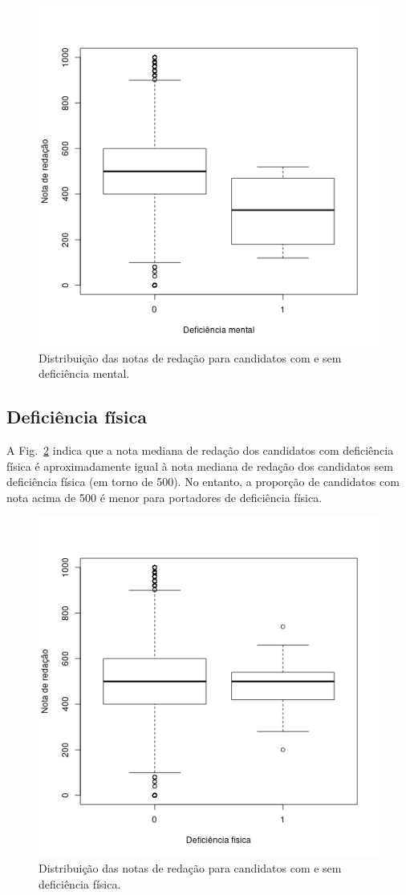 \documentclass[12pt]{article}
\newcommand{\reffig}[1]{Fig.~\ref{fig:#1}}
\begin{document}
\begin{figure}[H]
\centering\includegraphics[width=.55\linewidth]{../correlacao_deficiencia_mental.png}
\caption{Distribuição das notas de redação para candidatos com e sem deficiência mental.}
\label{fig:correlacao-deficiencia-mental}
\end{figure}

\subsection{Deficiência física}
A \reffig{correlacao-deficiencia-fisica} indica que a nota mediana de redação dos candidatos com deficiência física é aproximadamente igual à nota mediana de redação dos candidatos sem deficiência física (em torno de 500).
No entanto, a proporção de candidatos com nota acima de 500 é menor para portadores de deficiência física.
\begin{figure}[H]
\centering\includegraphics[width=.55\linewidth]{../correlacao_deficiencia_fisica.png}
\caption{Distribuição das notas de redação para candidatos com e sem deficiência física.}
\label{fig:correlacao-deficiencia-fisica}
\end{figure}
\end{document}
